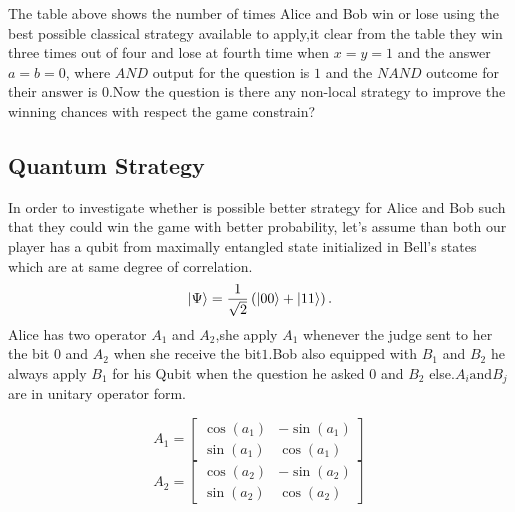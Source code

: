 The table above shows the number of times Alice and Bob win or lose using the best possible  classical strategy available to apply,it clear from the table they win three times out of four and lose at fourth time when $x=y=1$ and the answer $a=b=0$, where $AND$ output for the question is $1$ and the $NAND$ outcome for their answer is $0$.Now the question is there any non-local  strategy  to improve the winning chances with respect the game constrain?

\subsection{Quantum Strategy}\hfill \break
In order to investigate whether is possible better strategy for Alice and Bob such that they could  win the game with better probability, let's assume  than both our player has a qubit from maximally  entangled state initialized in Bell's states which are  at same degree of correlation.
\begin{equation}
\ket{\Psi }= \frac{1}{\sqrt{2}}\left( \ket{00} +\ket{11} \right)\label{EQ:1} .
\end{equation}
Alice has two operator $A_1$ and $A_2$,she apply $A_1$ whenever the judge sent to her the bit $0$ and $A_2$ when she receive the bit$1$.Bob also equipped with $B_1$ and $B_2$ he always apply $B_1$ for his Qubit when the question he asked $0$ and $B_2$ else.$A_i \text{and} B_j$ are in unitary operator form.

\[
A_1=
  \begin{bmatrix}
   \cos(a_1) & -\sin(a_1)\\
   \sin(a_1) & \cos(a_1)
  \end{bmatrix}
\]
\[
A_2=
  \begin{bmatrix}
   \cos(a_2) & -\sin(a_2)\\
   \sin(a_2) & \cos(a_2)
  \end{bmatrix}
\]

